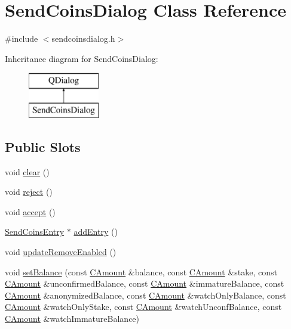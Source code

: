 \hypertarget{class_send_coins_dialog}{}\section{Send\+Coins\+Dialog Class Reference}
\label{class_send_coins_dialog}


{\ttfamily \#include $<$sendcoinsdialog.\+h$>$}

Inheritance diagram for Send\+Coins\+Dialog\+:\begin{figure}[H]
\begin{center}
\leavevmode
\includegraphics[height=2.000000cm]{class_send_coins_dialog}
\end{center}
\end{figure}
\subsection*{Public Slots}
\begin{DoxyCompactItemize}
\item 
void \hyperlink{class_send_coins_dialog_a127bddff45f49ff5e6e263efe218ae26}{clear} ()
\item 
void \hyperlink{class_send_coins_dialog_a4879553d77d29f522ac92ac04580f4ad}{reject} ()
\item 
void \hyperlink{class_send_coins_dialog_af2185c3d29e43d37c30669f0def46060}{accept} ()
\item 
\hyperlink{class_send_coins_entry}{Send\+Coins\+Entry} $\ast$ \hyperlink{class_send_coins_dialog_a3d680a76b967641115c6ff2fa83fb62a}{add\+Entry} ()
\item 
void \hyperlink{class_send_coins_dialog_a62cbf7e0adc3caf4b4821f7a692ac175}{update\+Remove\+Enabled} ()
\item 
void \hyperlink{class_send_coins_dialog_a7f02f2589cb65b508ccb3b02aad06979}{set\+Balance} (const \hyperlink{amount_8h_a4eaf3a5239714d8c45b851527f7cb564}{C\+Amount} \&balance, const \hyperlink{amount_8h_a4eaf3a5239714d8c45b851527f7cb564}{C\+Amount} \&stake, const \hyperlink{amount_8h_a4eaf3a5239714d8c45b851527f7cb564}{C\+Amount} \&unconfirmed\+Balance, const \hyperlink{amount_8h_a4eaf3a5239714d8c45b851527f7cb564}{C\+Amount} \&immature\+Balance, const \hyperlink{amount_8h_a4eaf3a5239714d8c45b851527f7cb564}{C\+Amount} \&anonymized\+Balance, const \hyperlink{amount_8h_a4eaf3a5239714d8c45b851527f7cb564}{C\+Amount} \&watch\+Only\+Balance, const \hyperlink{amount_8h_a4eaf3a5239714d8c45b851527f7cb564}{C\+Amount} \&watch\+Only\+Stake, const \hyperlink{amount_8h_a4eaf3a5239714d8c45b851527f7cb564}{C\+Amount} \&watch\+Unconf\+Balance, const \hyperlink{amount_8h_a4eaf3a5239714d8c45b851527f7cb564}{C\+Amount} \&watch\+Immature\+Balance)
\end{DoxyCompactItemize}
